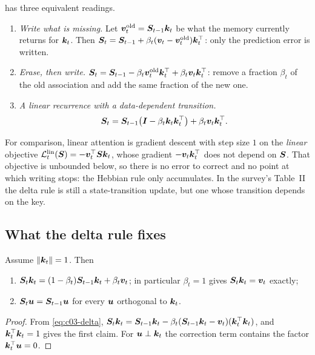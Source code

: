  has three equivalent readings.
\begin{enumerate}
\item \emph{Write what is missing.} Let $\bm{v}_t^{\text{old}}=\bm{S}_{t-1}\bm{k}_t$ be what the memory
currently returns for $\bm{k}_t$. Then $\bm{S}_t=\bm{S}_{t-1}+\beta_t(\bm{v}_t-\bm{v}_t^{\text{old}})\bm{k}_t^{\top}$:
only the prediction error is written.
\item \emph{Erase, then write.}
$\bm{S}_t=\bm{S}_{t-1}-\beta_t\bm{v}_t^{\text{old}}\bm{k}_t^{\top}+\beta_t\bm{v}_t\bm{k}_t^{\top}$: remove a fraction
$\beta_t$ of the old association and add the same fraction of the new one.
\item \emph{A linear recurrence with a data-dependent transition.}
\begin{equation}\label{eq:c03-delta-transition}
  \bm{S}_t=\bm{S}_{t-1}\big(\bm{I}-\beta_t\bm{k}_t\bm{k}_t^{\top}\big)+\beta_t\bm{v}_t\bm{k}_t^{\top} .
\end{equation}
\end{enumerate}
For comparison, linear attention is gradient descent with step size $1$ on the \emph{linear}
objective $\mathcal{L}_t^{\text{lin}}(\bm{S})=-\bm{v}_t^{\top}\bm{S}\bm{k}_t$, whose gradient $-\bm{v}_t\bm{k}_t^{\top}$ does not
depend on $\bm{S}$. That objective is unbounded below, so there is no error to correct and no point
at which writing stops: the Hebbian rule only accumulates. In the survey's Table~II the delta
rule is still a state-transition update, but one whose transition depends on the key.

\subsection{What the delta rule fixes}

\begin{proposition}\label{prop:c03-delta-overwrite}
Assume $\left\lVert \bm{k}_t\right\rVert=1$. Then
\begin{enumerate}
\item $\bm{S}_t\bm{k}_t=(1-\beta_t)\bm{S}_{t-1}\bm{k}_t+\beta_t\bm{v}_t$; in particular $\beta_t=1$ gives
$\bm{S}_t\bm{k}_t=\bm{v}_t$ exactly;
\item $\bm{S}_t\bm{u}=\bm{S}_{t-1}\bm{u}$ for every $\bm{u}$ orthogonal to $\bm{k}_t$.
\end{enumerate}
\end{proposition}

\begin{proof}
From \cref{eq:c03-delta},
$\bm{S}_t\bm{k}_t=\bm{S}_{t-1}\bm{k}_t-\beta_t(\bm{S}_{t-1}\bm{k}_t-\bm{v}_t)(\bm{k}_t^{\top}\bm{k}_t)$, and
$\bm{k}_t^{\top}\bm{k}_t=1$ gives the first claim. For $\bm{u}\perp\bm{k}_t$ the correction term contains the
factor $\bm{k}_t^{\top}\bm{u}=0$.
\end{proof}

